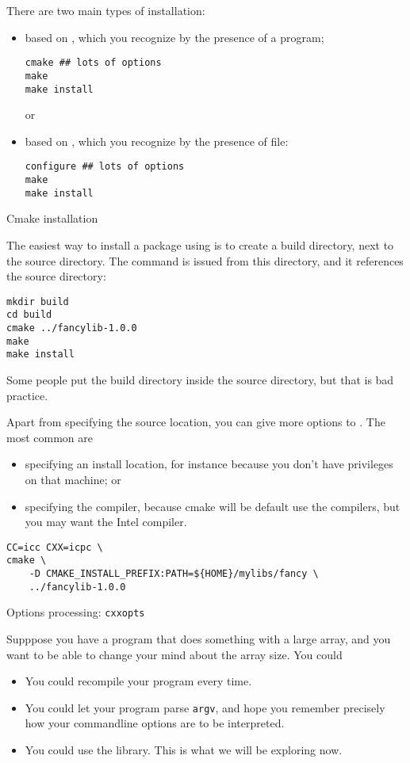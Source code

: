 There are two main types of installation:
\begin{itemize}
\item based on
  ,
  which you recognize by the presence of a  program;
\begin{verbatim}
cmake ## lots of options
make 
make install
\end{verbatim}
or
\item based on ,
  which you recognize by the presence of  file:
\begin{verbatim}
configure ## lots of options
make 
make install
\end{verbatim}
\end{itemize}

 {Cmake installation}

The easiest way to install a package using  is to create a build directory,
next to the source directory. The  command is issued from this directory,
and it references the source directory:
\begin{verbatim}
mkdir build
cd build
cmake ../fancylib-1.0.0
make 
make install
\end{verbatim}
Some people put the build directory inside the source directory,
but that is bad practice.

Apart from specifying the source location,
you can give more options to .
The most common are
\begin{itemize}
\item specifying an install location, for instance because you don't have 
  privileges on that machine; or
\item specifying the compiler, because cmake will be default use the 
  compilers, but you may want the Intel compiler.
\end{itemize}
\begin{verbatim}
CC=icc CXX=icpc \
cmake \
    -D CMAKE_INSTALL_PREFIX:PATH=${HOME}/mylibs/fancy \
    ../fancylib-1.0.0
\end{verbatim}

 {Options processing: \texttt{cxxopts}}
\label{sec:cxxoptlib}

Supppose you have a program that does something with a large array,
and you want to be able to change your mind about the array size.
You could
\begin{itemize}
\item You could recompile your program every time.
\item You could let your program parse \lstinline{argv}, and hope
  you remember precisely how your commandline options are to be interpreted.
\item You could use the \indextermtt{cxxopts} library.
  This is what we will be exploring now.
\end{itemize}

